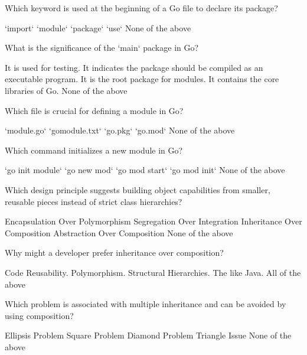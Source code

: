 \documentclass[12pt]{exam}
\begin{document}
\begin{questions}
\question[2]  Which keyword is used at the beginning of a Go file to declare its package?
\begin{choices}
\choice  `import`
\choice  `module`
\CorrectChoice  `package`
\choice  `use`
\choice  None of the above
\end{choices}
 
\question[2]  What is the significance of the `main` package in Go?
\begin{choices}
\choice  It is used for testing.
\CorrectChoice  It indicates the package should be compiled as an executable program.
\choice  It is the root package for modules.
\choice  It contains the core libraries of Go.
\choice  None of the above
\end{choices}
 
\question[2]  Which file is crucial for defining a module in Go?
\begin{choices}
\choice  `module.go`
\choice  `gomodule.txt`
\choice  `go.pkg`
\CorrectChoice  `go.mod`
\choice  None of the above
\end{choices}
 
\question[2]  Which command initializes a new module in Go?
\begin{choices}
\choice  `go init module`
\choice  `go new mod`
\choice  `go mod start`
\CorrectChoice  `go mod init`
\choice  None of the above
\end{choices}
 
\question[2]  Which design principle suggests building object capabilities from smaller, reusable pieces instead of strict class hierarchies?
\begin{choices}
\choice  Encapsulation Over Polymorphism
\choice  Segregation Over Integration
\choice  Inheritance Over Composition
\choice  Abstraction Over Composition
\CorrectChoice  None of the above
\end{choices}
 
\question[2]  Why might a developer prefer inheritance over composition?
\begin{choices}
\choice  Code Reusability.
\choice  Polymorphism.
\CorrectChoice  Structural Hierarchies.
\choice  The like Java.
\choice  All of the above
\end{choices}
 
\question[2]  Which problem is associated with multiple inheritance and can be avoided by using composition?
\begin{choices}
\choice  Ellipsis Problem
\choice  Square Problem
\CorrectChoice  Diamond Problem
\choice  Triangle Issue
\choice  None of the above
\end{choices}
 

\end{questions}
\end{document}
